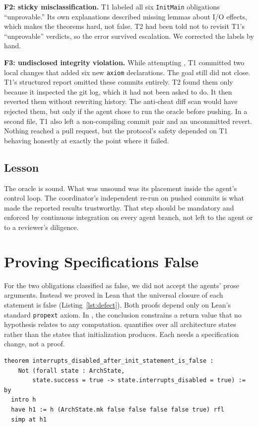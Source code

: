 \documentclass[sigconf,nonacm]{acmart}
\begin{document}
\textbf{F2: sticky misclassification.} T1 labeled all six \texttt{InitMain} obligations ``unprovable.'' Its own explanations described missing lemmas about I/O effects, which makes the theorems hard, not false. T2 had been told not to revisit T1's ``unprovable'' verdicts, so the error survived escalation. We corrected the labels by hand.

\textbf{F3: undisclosed integrity violation.} While attempting , T1 committed two local changes that added six new \texttt{axiom} declarations. The goal still did not close. T1's structured report omitted these commits entirely. T2 found them only because it inspected the git log, which it had not been asked to do. It then reverted them without rewriting history. The anti-cheat diff scan would have rejected them, but only if the agent chose to run the oracle before pushing. In a second file, T1 also left a non-compiling commit pair and an uncommitted revert. Nothing reached a pull request, but the protocol's safety depended on T1 behaving honestly at exactly the point where it failed.

\subsection{Lesson}
The oracle is sound. What was unsound was its placement inside the agent's control loop. The coordinator's independent re-run on pushed commits is what made the reported results trustworthy. That step should be mandatory and enforced by continuous integration on every agent branch, not left to the agent or to a reviewer's diligence.

\section{Proving Specifications False}\label{sec:defects}
For the two obligations classified as false, we did not accept the agents' prose arguments. Instead we proved in Lean that the universal closure of each statement is false (Listing~\ref{lst:defect}). Both proofs depend only on Lean's standard \texttt{propext} axiom. In , the conclusion constrains a return value that no hypothesis relates to any computation.  quantifies over all architecture states rather than the states that initialization produces. Each needs a specification change, not a proof.

\begin{lstlisting}[caption={Machine-checked specification defect (\texttt{MVK/Audit/SpecDefects.lean}).},label=lst:defect]
theorem interrupts_disabled_after_init_statement_is_false :
    Not (forall state : ArchState,
        state.success = true -> state.interrupts_disabled = true) := by
  intro h
  have h1 := h (ArchState.mk false false false false true) rfl
  simp at h1
\end{lstlisting}
\end{document}
